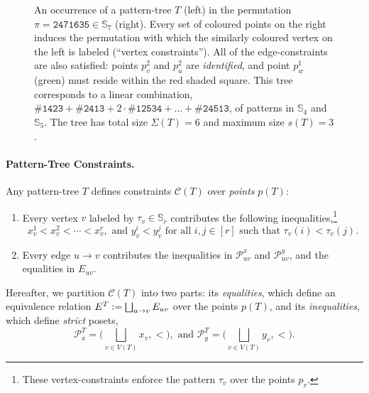 \documentclass{article}
\newcommand{\pce}[1]{{\# \mathtt{#1} }}
\newcommand{\eqdef}{\vcentcolon=}
\theoremstyle{remark}
\theoremstyle{plain}
\begin{document}
\begin{figure}[H]
    \caption{An occurrence of a pattern-tree $T$ (left) in the permutation $\pi = \mathtt{2471635} \in \mathbb{S}_7$ (right).
    Every set of coloured points on the right induces the permutation with which the similarly coloured vertex on the left is labeled (``vertex constraints'').
    All of the edge-constraints are also satisfied: points $p_v^2$ and $p_u^2$ are \textit{identified},
    and point $p_w^1$ (green) must reside within the red shaded square.
    This tree corresponds to a linear combination, $\pce{1423} + \pce{2413} + 2 \cdot \pce{12534} + \dots + \pce{24513}$, of patterns in $\mathbb{S}_4$ and $\mathbb{S}_5$.
    The tree has total size $\Sigma(T)=6$ and maximum size $s(T)=3$.
   }
    \label{fig:pattern_tree}
\end{figure}



\paragraph{Pattern-Tree Constraints.} Any pattern-tree $T$ defines constraints $\mathcal{C}(T)$ over \textit{points} $p(T)$:
\begin{enumerate}
    \item Every vertex $v$ labeled by $\tau_v \in \mathbb{S}_r$ contributes the following inequalities,\footnote{These vertex-constraints  enforce the pattern $\tau_v$ over the points $p_v$.} 
    \[
        x_v^1 < x_v^2 < \cdots < x_v^r, \text{ and } y_v^i < y_v^j \text { for all $i,j\in [r]$ such that $\tau_v(i)<\tau_v(j)$}.
    \]
    \item Every edge $u \to v$ contributes the inequalities in $\mathcal{P}_{uv}^x$ and $\mathcal{P}_{uv}^y$, and the equalities in $E_{uv}$.
\end{enumerate}
Hereafter, we partition $\mathcal{C}(T)$ into two parts: its \textit{equalities},
which define an equivalence relation $E^T \eqdef \bigsqcup_{u \to v} E_{uv}$ over the points $p(T)$,
and its \textit{inequalities}, which define \textit{strict} posets,
\[
    \mathcal{P}_x^T = \Big(\bigsqcup_{v \in V(T)} x_v, < \Big), \text{ and }\mathcal{P}_y^T = \Big(\bigsqcup_{v \in V(T)} y_v, < \Big).
\]
\end{document}
